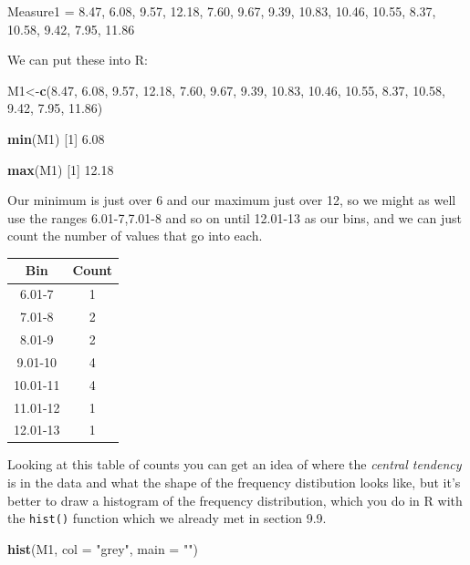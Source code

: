 \documentclass[
]{book}
\newenvironment{Shaded}{\begin{snugshade}}{\end{snugshade}}
\newcommand{\DataTypeTok}[1]{\textcolor[rgb]{0.13,0.29,0.53}{#1}}
\newcommand{\DecValTok}[1]{\textcolor[rgb]{0.00,0.00,0.81}{#1}}
\newcommand{\FloatTok}[1]{\textcolor[rgb]{0.00,0.00,0.81}{#1}}
\newcommand{\KeywordTok}[1]{\textcolor[rgb]{0.13,0.29,0.53}{\textbf{#1}}}
\newcommand{\NormalTok}[1]{#1}
\newcommand{\StringTok}[1]{\textcolor[rgb]{0.31,0.60,0.02}{#1}}
\begin{document}
Measure1 = 8.47, 6.08, 9.57, 12.18, 7.60, 9.67, 9.39, 10.83, 10.46, 10.55, 8.37, 10.58, 9.42, 7.95, 11.86

We can put these into R:

\begin{Shaded}
\begin{Highlighting}[]
\NormalTok{M1<-}\KeywordTok{c}\NormalTok{(}\FloatTok{8.47}\NormalTok{, }\FloatTok{6.08}\NormalTok{, }\FloatTok{9.57}\NormalTok{, }\FloatTok{12.18}\NormalTok{, }\FloatTok{7.60}\NormalTok{, }\FloatTok{9.67}\NormalTok{, }\FloatTok{9.39}\NormalTok{, }\FloatTok{10.83}\NormalTok{, }\FloatTok{10.46}\NormalTok{, }\FloatTok{10.55}\NormalTok{, }\FloatTok{8.37}\NormalTok{, }\FloatTok{10.58}\NormalTok{, }\FloatTok{9.42}\NormalTok{, }\FloatTok{7.95}\NormalTok{, }\FloatTok{11.86}\NormalTok{)}

\KeywordTok{min}\NormalTok{(M1)}
\NormalTok{[}\DecValTok{1}\NormalTok{] }\FloatTok{6.08}

\KeywordTok{max}\NormalTok{(M1)}
\NormalTok{[}\DecValTok{1}\NormalTok{] }\FloatTok{12.18}
\end{Highlighting}
\end{Shaded}

Our minimum is just over 6 and our maximum just over 12, so we might as well use the ranges 6.01-7,7.01-8 and so on until 12.01-13 as our bins, and we can just count the number of values that go into each.

\begin{longtable}[]{@{}cc@{}}
\toprule
Bin & Count\tabularnewline
\midrule
\endhead
6.01-7 & 1\tabularnewline
7.01-8 & 2\tabularnewline
8.01-9 & 2\tabularnewline
9.01-10 & 4\tabularnewline
10.01-11 & 4\tabularnewline
11.01-12 & 1\tabularnewline
12.01-13 & 1\tabularnewline
\bottomrule
\end{longtable}

Looking at this table of counts you can get an idea of where the \emph{central tendency} is in the data and what the shape of the frequency distibution looks like, but it's better to draw a histogram of the frequency distribution, which you do in R with the \texttt{hist()} function which we already met in section 9.9.

\begin{Shaded}
\begin{Highlighting}[]
\KeywordTok{hist}\NormalTok{(M1, }\DataTypeTok{col =} \StringTok{"grey"}\NormalTok{, }\DataTypeTok{main =} \StringTok{""}\NormalTok{)}
\end{Highlighting}
\end{Shaded}
\end{document}
